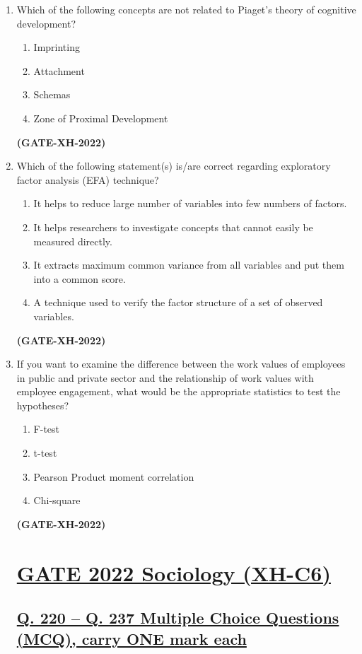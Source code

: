 \documentclass[journal]{IEEEtran}
\begin{document}
\begin{enumerate}
\item
Which of the following concepts are not related to Piaget’s theory of cognitive development? 
\begin{multicols}{2}
\begin{enumerate}
\item Imprinting 
\item Attachment 
\item Schemas 
\item Zone of Proximal Development 
\end{enumerate}
\end{multicols}
\hfill\textbf{(GATE-XH-2022)}

\item
Which of the following statement(s) is/are correct regarding exploratory factor analysis (EFA) technique? 
\begin{enumerate}
\item It helps to reduce large number of variables into few numbers of factors. 
\item It helps researchers to investigate concepts that cannot easily be measured directly. 
\item It extracts maximum common variance from all variables and put them into a common score. 
\item A technique used to verify the factor structure of a set of observed variables.
\end{enumerate}
\hfill\textbf{(GATE-XH-2022)}

\item
If you want to examine the difference between the work values of employees in public and private sector and the relationship of work values with employee engagement, what would be the appropriate statistics to test the hypotheses? 
\begin{multicols}{2}
\begin{enumerate}
\item F-test 
\item t-test 
\item Pearson Product moment correlation 
\item Chi-square
\end{enumerate}
\end{multicols}
\hfill\textbf{(GATE-XH-2022)}
\section*{\large \underline{\textbf {GATE 2022 Sociology (XH-C6)}}}
\subsection*{\underline{\textbf {Q. 220 – Q. 237 Multiple Choice Questions (MCQ), carry ONE mark each}}}


\end{enumerate}
\end{document}
